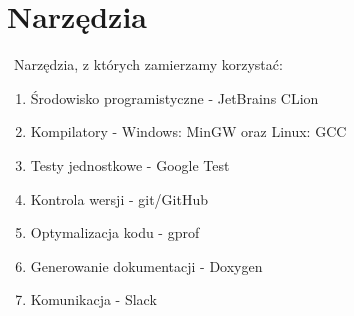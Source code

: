 {\let\clearpage\relax \chapter{Narzędzia}}
\
Narzędzia, z których zamierzamy korzystać:
\begin{enumerate}
\item Środowisko programistyczne - JetBrains CLion
\item Kompilatory - Windows: MinGW oraz Linux: GCC
\item Testy jednostkowe - Google Test
\item Kontrola wersji - git/GitHub
\item Optymalizacja kodu - gprof
\item Generowanie dokumentacji - Doxygen
\item Komunikacja - Slack
\end{enumerate}